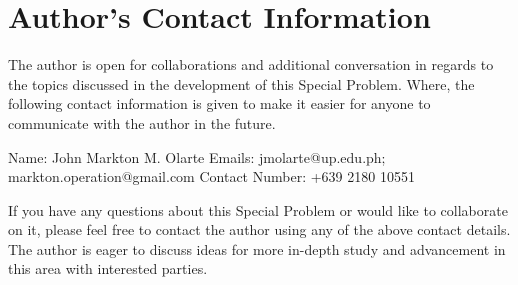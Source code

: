 \chapter{Author's Contact Information}
\label{sec:appendix_f}
The author is open for collaborations and additional conversation in regards
to the topics discussed in the development of this Special Problem. Where,
the following contact information is given to make it easier for anyone to 
communicate with the author in the future.
\\

\begin{python}
Name: John Markton M. Olarte
Emails: jmolarte@up.edu.ph; markton.operation@gmail.com
Contact Number: +639 2180 10551
\end{python}

If you have any questions about this Special Problem or would like to collaborate on it, 
please feel free to contact the author using any of the above contact details.
The author is eager to discuss ideas for more in-depth study and advancement 
in this area with interested parties.

